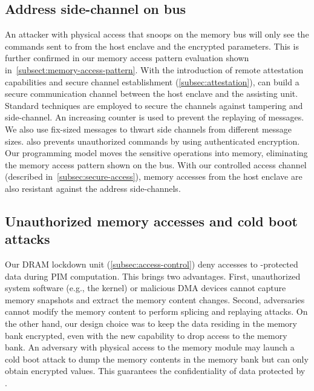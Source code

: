 

\subsection{Address side-channel on bus} An attacker with physical access that snoops on the memory bus will only see the commands sent to \thename from the host enclave and the encrypted parameters. This is further confirmed in our memory access pattern evaluation shown in~\cref{subsect:memory-access-pattern}. With the introduction of remote attestation capabilities and secure channel establishment (\cref{subsec:attestation}), \thename can build a secure communication channel between the host enclave and the assisting \thename unit. Standard techniques are employed to secure the channels against tampering and side-channel. An increasing counter is used to prevent the replaying of messages. We also use fix-sized messages to thwart side channels from different message sizes. \thename also prevents unauthorized commands by using authenticated encryption. Our programming model moves the sensitive operations into memory, eliminating the memory access pattern shown on the bus.  With our controlled access channel (described in~\cref{subsec:secure-access}), memory accesses from the host enclave are also resistant against the address side-channels.

\subsection{Unauthorized memory accesses and cold boot attacks} Our DRAM lockdown unit (\cref{subsec:access-control}) deny accesses to \thename-protected data during PIM computation. This brings two advantages. First, unauthorized system software (e.g., the kernel) or malicious DMA devices cannot capture memory snapshots and extract the memory content changes. Second, adversaries cannot modify the memory content to perform splicing and replaying attacks.
On the other hand, our design choice was to keep the data residing in the memory bank encrypted, even with the new capability to drop access to the memory bank. An adversary with physical access to the memory module may launch a cold boot attack to dump the memory contents in the memory bank but can only obtain encrypted values. This guarantees the confidentiality of data protected by \thename.


